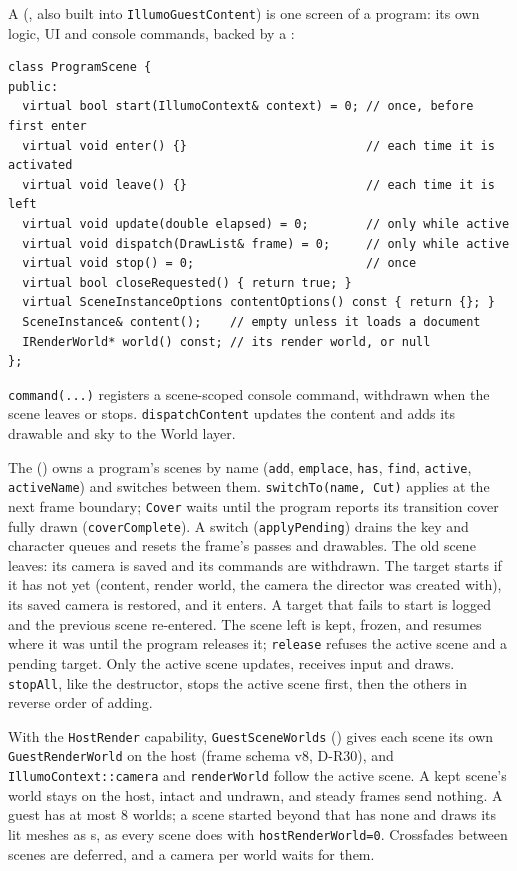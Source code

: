 A 
(, also built into
\texttt{IllumoGuestContent}) is one screen of a program: its own logic, UI and
console commands, backed by a :
\begin{lstlisting}
class ProgramScene {
public:
  virtual bool start(IllumoContext& context) = 0; // once, before first enter
  virtual void enter() {}                         // each time it is activated
  virtual void leave() {}                         // each time it is left
  virtual void update(double elapsed) = 0;        // only while active
  virtual void dispatch(DrawList& frame) = 0;     // only while active
  virtual void stop() = 0;                        // once
  virtual bool closeRequested() { return true; }
  virtual SceneInstanceOptions contentOptions() const { return {}; }
  SceneInstance& content();    // empty unless it loads a document
  IRenderWorld* world() const; // its render world, or null
};
\end{lstlisting}
\texttt{command(...)} registers a scene-scoped console command, withdrawn when
the scene leaves or stops. \texttt{dispatchContent} updates the content and
adds its drawable and sky to the World layer.

The 
() owns a program's
scenes by name (\texttt{add}, \texttt{emplace}, \texttt{has}, \texttt{find},
\texttt{active}, \texttt{activeName}) and switches between them.
\texttt{switchTo(name, Cut)} applies at the next frame boundary; \texttt{Cover}
waits until the program reports its transition cover fully drawn
(\texttt{coverComplete}). A switch (\texttt{applyPending}) drains the key and
character queues and resets the frame's passes and drawables. The old scene
leaves: its camera is saved and its commands are withdrawn. The target starts
if it has not yet (content, render world, the camera the director was created
with), its saved camera is restored, and it enters. A target that fails to
start is logged and the previous scene re-entered. The scene left is kept,
frozen, and resumes where it was until the program releases it;
\texttt{release} refuses the active scene and a pending target. Only the
active scene updates, receives input and draws. \texttt{stopAll}, like the
destructor, stops the active scene first, then the others in reverse order of
adding.

With the \texttt{HostRender} capability, \texttt{GuestSceneWorlds}
() gives each scene its
own \texttt{GuestRenderWorld} on the host (frame schema v8, D-R30), and
\texttt{IllumoContext::camera} and \texttt{renderWorld} follow the active
scene. A kept scene's world stays on the host, intact and undrawn, and steady
frames send nothing. A guest has at most 8 worlds; a scene started beyond that
has none and draws its lit meshes as s, as every scene
does with \texttt{hostRenderWorld=0}. Crossfades between scenes are deferred,
and a camera per world waits for them.

